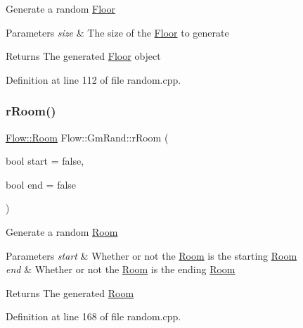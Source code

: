 Generate a random \hyperlink{class_flow_1_1_floor}{Floor} 
\begin{DoxyParams}{Parameters}
{\em size} & The size of the \hyperlink{class_flow_1_1_floor}{Floor} to generate \\
\hline
\end{DoxyParams}
\begin{DoxyReturn}{Returns}
The generated \hyperlink{class_flow_1_1_floor}{Floor} object 
\end{DoxyReturn}


Definition at line 112 of file random.\+cpp.

\hypertarget{class_flow_1_1_gm_rand_a8a978d8967082e7e519996204c29eb9d}{}\label{class_flow_1_1_gm_rand_a8a978d8967082e7e519996204c29eb9d} 
\subsubsection{\texorpdfstring{r\+Room()}{rRoom()}}
{\footnotesize\ttfamily \hyperlink{class_flow_1_1_room}{Flow\+::\+Room} Flow\+::\+Gm\+Rand\+::r\+Room (\begin{DoxyParamCaption}\item[{bool}]{start = {\ttfamily false},  }\item[{bool}]{end = {\ttfamily false} }\end{DoxyParamCaption})}

Generate a random \hyperlink{class_flow_1_1_room}{Room} 
\begin{DoxyParams}{Parameters}
{\em start} & Whether or not the \hyperlink{class_flow_1_1_room}{Room} is the starting \hyperlink{class_flow_1_1_room}{Room} \\
\hline
{\em end} & Whether or not the \hyperlink{class_flow_1_1_room}{Room} is the ending \hyperlink{class_flow_1_1_room}{Room} \\
\hline
\end{DoxyParams}
\begin{DoxyReturn}{Returns}
The generated \hyperlink{class_flow_1_1_room}{Room} 
\end{DoxyReturn}


Definition at line 168 of file random.\+cpp.

\hypertarget{class_flow_1_1_gm_rand_a8a8b7dafe3991717c68beb1f13409f77}{}\label{class_flow_1_1_gm_rand_a8a8b7dafe3991717c68beb1f13409f77} 
